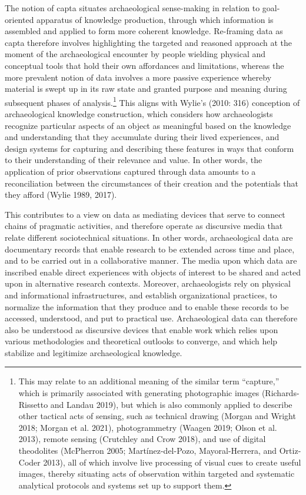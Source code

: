 \documentclass[
]{article}
\begin{document}
The notion of capta situates archaeological sense-making in relation to
goal-oriented apparatus of knowledge production, through which
information is assembled and applied to form more coherent knowledge.
Re-framing data as capta therefore involves highlighting the targeted
and reasoned approach at the moment of the archaeological encounter by
people wielding physical and conceptual tools that hold their own
affordances and limitations, whereas the more prevalent notion of data
involves a more passive experience whereby material is swept up in its
raw state and granted purpose and meaning during subsequent phases of
analysis.\footnote{This may relate to an additional meaning of the
  similar term ``capture,'' which is primarily associated with
  generating photographic images (Richards-Rissetto and Landau 2019),
  but which is also commonly applied to describe other tactical acts of
  sensing, such as technical drawing (Morgan and Wright 2018; Morgan et
  al. 2021), photogrammetry (Waagen 2019; Olson et al. 2013), remote
  sensing (Crutchley and Crow 2018), and use of digital theodolites
  (McPherron 2005; Martínez-del-Pozo, Mayoral-Herrera, and Ortiz-Coder
  2013), all of which involve live processing of visual cues to create
  useful images, thereby situating acts of observation within targeted
  and systematic analytical protocols and systems set up to support
  them.} This aligns with Wylie's (2010: 316) conception of
archaeological knowledge construction, which considers how
archaeologists recognize particular aspects of an object as meaningful
based on the knowledge and understanding that they accumulate during
their lived experiences, and design systems for capturing and describing
these features in ways that conform to their understanding of their
relevance and value. In other words, the application of prior
observations captured through data amounts to a reconciliation between
the circumstances of their creation and the potentials that they afford
(Wylie 1989, 2017).

This contributes to a view on data as mediating devices that serve to
connect chains of pragmatic activities, and therefore operate as
discursive media that relate different sociotechnical situations. In
other words, archaeological data are documentary records that enable
research to be extended across time and place, and to be carried out in
a collaborative manner. The media upon which data are inscribed enable
direct experiences with objects of interest to be shared and acted upon
in alternative research contexts. Moreover, archaeologists rely on
physical and informational infrastructures, and establish organizational
practices, to normalize the information that they produce and to enable
these records to be accessed, understood, and put to practical use.
Archaeological data can therefore also be understood as discursive
devices that enable work which relies upon various methodologies and
theoretical outlooks to converge, and which help stabilize and
legitimize archaeological knowledge.
\end{document}
